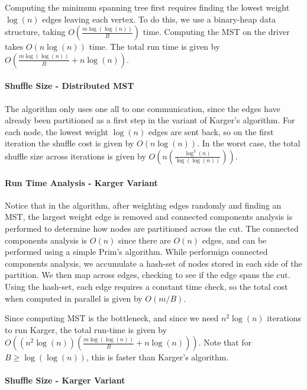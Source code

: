 \documentclass[12pt]{article}
\begin{document}
Computing the minimum spanning tree first requires finding the lowest weight $\log(n)$ edges leaving each vertex. To do this, we use a binary-heap data structure, taking $O(\frac{m\log(\log(n))}{B})$ time. Computing the MST on the driver takes $O(n \log(n))$ time. The total run time is given by $O(\frac{m \log(\log(n))}{B} + n\log(n))$.

\paragraph{Shuffle Size - Distributed MST}

The algorithm only uses one all to one communication, since the edges have already been partitioned as a first step in the variant of Karger's algorithm. For each node, the lowest weight $\log(n)$ edges are sent back, so on the first iteration the shuffle cost is given by $O(n\log(n))$. In the worst case, the total shuffle size across iterations is given by $O(n (\frac{\log^2(n)}{\log(\log(n))}))$.

\paragraph{Run Time Analysis - Karger Variant}

Notice that in the algorithm, after weighting edges randomly and finding an MST, the largest weight edge is removed and connected components analysis is performed to determine how nodes are partitioned across the cut. The connected components analysis is $O(n)$ since there are $O(n)$ edges, and can be performed using a simple Prim's algorithm. While performign connected components analysis, we accumulate a hash-set of nodes stored in each side of the partition. We then map across edges, checking to see if the edge spans the cut. Using the hash-set, each edge requires a constant time check, so the total cost when computed in parallel is given by $O(m/B)$.

Since computing MST is the bottleneck, and since we need $n^2 \log(n)$ iterations to run Karger, the total run-time is given by \\
$O((n^2 \log(n)) (\frac{m \log(\log(n))}{B} + n \log(n)))$. Note that for $B \geq \log(\log(n))$, this is faster than Karger's algorithm.

\paragraph{Shuffle Size - Karger Variant}
\end{document}
